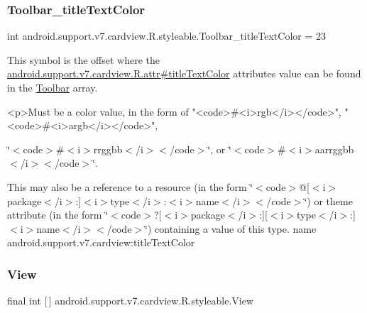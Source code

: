 \subsubsection{\texorpdfstring{Toolbar\+\_\+title\+Text\+Color}{Toolbar\_titleTextColor}}
{\footnotesize\ttfamily int android.\+support.\+v7.\+cardview.\+R.\+styleable.\+Toolbar\+\_\+title\+Text\+Color = 23\hspace{0.3cm}{\ttfamily [static]}}

This symbol is the offset where the \hyperlink{classandroid_1_1support_1_1v7_1_1cardview_1_1R_1_1attr_aeb03451b46c4b9a227b1dc0d451dfd00}{android.\+support.\+v7.\+cardview.\+R.\+attr\#title\+Text\+Color} attribute\textquotesingle{}s value can be found in the \hyperlink{classandroid_1_1support_1_1v7_1_1cardview_1_1R_1_1styleable_a26149aeb8fd339abe09ecc9d92b9304f}{Toolbar} array.

\begin{DoxyVerb}      <p>Must be a color value, in the form of "<code>#<i>rgb</i></code>", "<code>#<i>argb</i></code>",
\end{DoxyVerb}
 \char`\"{}$<$code$>$\#$<$i$>$rrggbb$<$/i$>$$<$/code$>$\char`\"{}, or \char`\"{}$<$code$>$\#$<$i$>$aarrggbb$<$/i$>$$<$/code$>$\char`\"{}. 

This may also be a reference to a resource (in the form \char`\"{}$<$code$>$@\mbox{[}$<$i$>$package$<$/i$>$\+:\mbox{]}$<$i$>$type$<$/i$>$\+:$<$i$>$name$<$/i$>$$<$/code$>$\char`\"{}) or theme attribute (in the form \char`\"{}$<$code$>$?\mbox{[}$<$i$>$package$<$/i$>$\+:\mbox{]}\mbox{[}$<$i$>$type$<$/i$>$\+:\mbox{]}$<$i$>$name$<$/i$>$$<$/code$>$\char`\"{}) containing a value of this type.  name android.\+support.\+v7.\+cardview\+:title\+Text\+Color \mbox{\label{classandroid_1_1support_1_1v7_1_1cardview_1_1R_1_1styleable_a25c91e78e53c1aa0141b94584e88b486}} 
\subsubsection{\texorpdfstring{View}{View}}
{\footnotesize\ttfamily final int \mbox{[}$\,$\mbox{]} android.\+support.\+v7.\+cardview.\+R.\+styleable.\+View\hspace{0.3cm}{\ttfamily [static]}}

